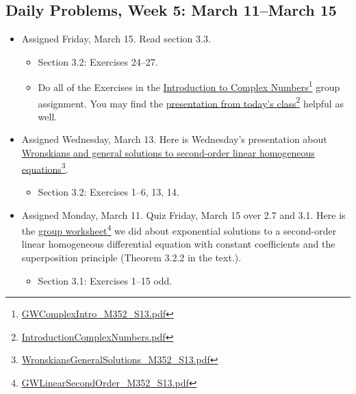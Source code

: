 \subsection{Daily Problems, Week 5: March 11--March 15}
\label{dailyproblemsweek5:march11--march15}

\begin{itemize}
\item Assigned Friday, March 15. Read section 3.3.

\begin{itemize}
\item Section 3.2: Exercises 24--27.

\item Do all of the Exercises in the \href{GWComplexIntro_M352_S13.pdf}{Introduction to Complex Numbers}\footnote{\href{GWComplexIntro_M352_S13.pdf}{GWComplexIntro\_M352\_S13.pdf}} group assignment. You may find the \href{IntroductionComplexNumbers.pdf}{presentation from today's class}\footnote{\href{IntroductionComplexNumbers.pdf}{IntroductionComplexNumbers.pdf}} helpful as well.

\end{itemize}

\item Assigned Wednesday, March 13. Here is Wednesday's presentation about \href{WronskiansGeneralSolutions_M352_S13.pdf}{Wronskians and general solutions to second-order linear homogeneous equations}\footnote{\href{WronskiansGeneralSolutions_M352_S13.pdf}{WronskiansGeneralSolutions\_M352\_S13.pdf}}.

\begin{itemize}
\item Section 3.2: Exercises 1--6, 13, 14.

\end{itemize}

\item Assigned Monday, March 11. Quiz Friday, March 15 over 2.7 and 3.1. Here is the \href{GWLinearSecondOrder_M352_S13.pdf}{group worksheet}\footnote{\href{GWLinearSecondOrder_M352_S13.pdf}{GWLinearSecondOrder\_M352\_S13.pdf}} we did about exponential solutions to a second-order linear homogeneous differential equation with constant coefficients and the superposition principle (Theorem 3.2.2 in the text.).

\begin{itemize}
\item Section 3.1: Exercises 1--15 odd.

\end{itemize}

\end{itemize}

